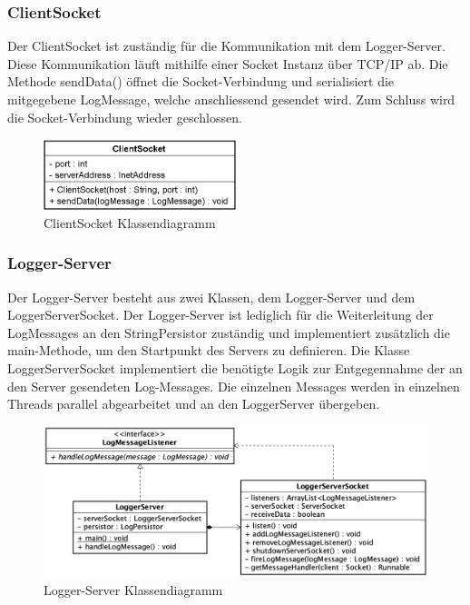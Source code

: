 \subsubsection{ClientSocket}
Der ClientSocket ist zuständig für die Kommunikation mit dem Logger-Server. Diese Kommunikation läuft mithilfe einer Socket Instanz über TCP/IP ab. Die Methode sendData() öffnet die Socket-Verbindung und serialisiert die mitgegebene LogMessage, welche anschliessend gesendet wird. Zum Schluss wird die Socket-Verbindung wieder geschlossen.

\begin{figure}[H]
	\centering
	\includegraphics[width=0.5\textwidth]{2_Architektur/Bilder/clientSocket.png}
	\caption{ClientSocket Klassendiagramm}
	\label{fig:ClientSocket Klassendiagramm}
\end{figure}

\subsubsection{Logger-Server}
Der Logger-Server besteht aus zwei Klassen, dem Logger-Server und dem LoggerServerSocket. Der Logger-Server ist lediglich für die Weiterleitung der LogMessages an den StringPersistor zuständig und implementiert zusätzlich die main-Methode, um den Startpunkt des Servers zu definieren. 
Die Klasse LoggerServerSocket implementiert die benötigte Logik zur Entgegennahme der an den Server gesendeten Log-Messages. Die einzelnen Messages werden in einzelnen Threads parallel abgearbeitet und an den LoggerServer übergeben. 

\begin{figure}[H]
	\centering
	\includegraphics[width=\textwidth]{2_Architektur/Bilder/loggerServer.png}
	\caption{Logger-Server Klassendiagramm}
	\label{fig:Logger-Server Klassendiagramm}
\end{figure}

